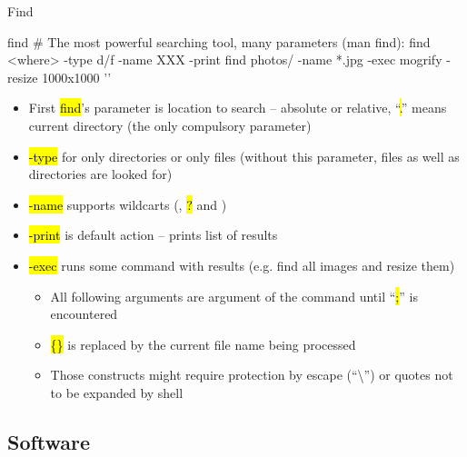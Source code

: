 \documentclass[compress, ucs, xelatex, 11pt, xcolor=svgnames,
  hyperref={
    bookmarks=true,
    unicode=true,
    colorlinks=true,
    pdftitle={Linux, command line and MetaCentrum},
    plainpages=false,
    pdfauthor={Vojtech Zeisek},
    pdfsubject={Course about use of Linux command line, writing shell scripts and using MetaCentrum of CESNET},
    pdfcreator={XeLaTeX},
    pdfkeywords={Linux, GNU, BASH, shell, command line, MetaCentrum},
    linkcolor=Red,
    anchorcolor=Blue,
    citecolor=Purple,
    filecolor=DodgerBlue,
    menucolor=DarkOrchid,
    urlcolor=DeepSkyBlue,
    pdftex},
  url={hyphens, lowtilde} %
  ]{beamer}
\renewcommand{\texttt}[1]{\hl{\ttfamily #1}}
\begin{document}
\begin{frame}[fragile]{Find}
  \begin{bashcode}
    find # The most powerful searching tool, many parameters (man find):
    find <where> -type d/f -name XXX -print
    find photos/ -name *.jpg -exec mogrify -resize 1000x1000 '{}' \;
  \end{bashcode}
  \begin{itemize}
    \item First \texttt{find}'s parameter is location to search -- absolute or relative, ``\texttt{.}'' means current directory (the only compulsory parameter)
    \item \texttt{-type} for only directories or only files (without this parameter, files as well as directories are looked for)
    \item \texttt{-name} supports wildcarts (\texttt{*}, \texttt{?} and \texttt{[\ldots]})
    \item \texttt{-print} is default action -- prints list of results
    \item \texttt{-exec} runs some command with results (e.g. find all images and resize them)
    \begin{itemize}
      \item All following arguments are argument of the command until ``\texttt{;}'' is encountered
      \item \texttt{\{\}} is replaced by the current file name being processed
      \item Those constructs might require protection by escape (``\textbackslash'') or quotes not to be expanded by shell
    \end{itemize}
  \end{itemize}
\end{frame}

\subsection{Software}
\end{document}
